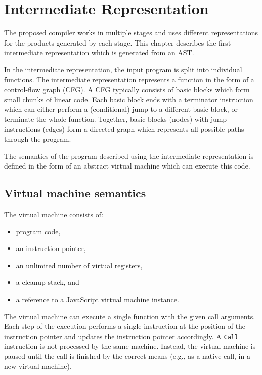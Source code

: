 \chapter{Intermediate Representation}

The proposed compiler works in multiple stages and uses different representations for the products generated by each stage. This chapter describes the first intermediate representation which is generated from an AST.

In the intermediate representation, the input program is split into individual functions. The intermediate representation represents a function in the form of a control-flow graph (CFG). A CFG typically consists of basic blocks which form small chunks of linear code. Each basic block ends with a terminator instruction which can either perform a (conditional) jump to a different basic block, or terminate the whole function. Together, basic blocks (nodes) with jump instructions (edges) form a directed graph which represents all possible paths through the program.

The semantics of the program described using the intermediate representation is defined in the form of an abstract virtual machine which can execute this code.

\section{Virtual machine semantics}

The virtual machine consists of:
\begin{itemize}
    \item program code,
    \item an instruction pointer,
    \item an unlimited number of virtual registers,
    \item a cleanup stack, and
    \item a reference to a JavaScript virtual machine instance.
\end{itemize}

The virtual machine can execute a single function with the given call arguments. Each step of the execution performs a single instruction at the position of the instruction pointer and updates the instruction pointer accordingly. A \texttt{Call} instruction is not processed by the same machine. Instead, the virtual machine is paused until the call is finished by the correct means (e.g., as a native call, in a new virtual machine).

